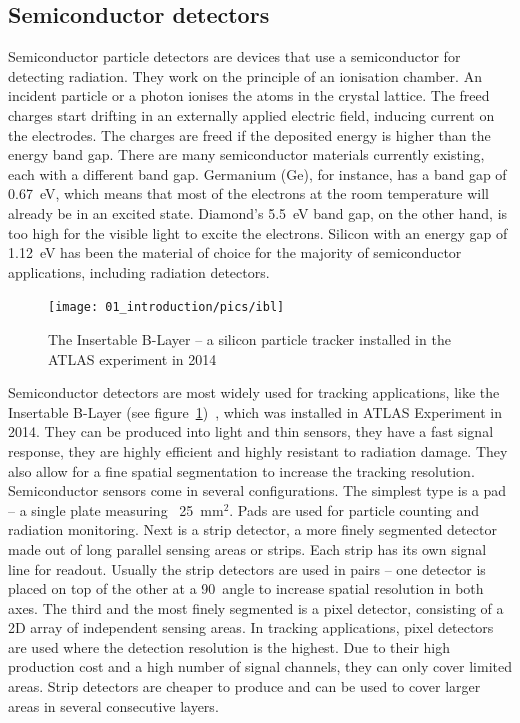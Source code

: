 

\subsection{Semiconductor detectors}
Semiconductor particle detectors are devices that use a semiconductor for detecting radiation. They work on the principle of an ionisation chamber. An incident particle or a photon ionises the atoms in the crystal lattice. The freed charges start drifting in an externally applied electric field, inducing current on the electrodes. The charges are freed if the deposited energy is higher than the energy band gap. There are many semiconductor materials currently existing, each with a different band gap. Germanium (Ge), for instance, has a band gap of 0.67~eV, which means that most of the electrons at the room temperature will already be in an excited state. Diamond's 5.5~eV band gap, on the other hand, is too high for the visible light to excite the electrons. Silicon with an energy gap of 1.12~eV has been the material of choice for the majority of semiconductor applications, including radiation detectors. 
\begin{figure}[!t]
\centering
\texttt{[image: 01\_introduction/pics/ibl]}
\caption{The Insertable B-Layer -- a silicon particle tracker installed in the ATLAS experiment in 2014 \cite{MarcelloniDeOliveira:1702006}}
\label{fig:ibl}
\end{figure}
Semiconductor detectors are most widely used for tracking applications, like the Insertable B-Layer (see figure~\ref{fig:ibl})~\cite{Pernegger:1985432}, which was installed in ATLAS Experiment in 2014. They can be produced into light and thin sensors, they have a fast signal response, they are highly efficient and highly resistant to radiation damage. They also allow for a fine spatial segmentation to increase the tracking resolution. Semiconductor sensors come in several configurations. The simplest type is a pad -- a single plate measuring ~25~mm$^2$. Pads are used for particle counting and radiation monitoring. Next is a strip detector, a more finely segmented detector made out of long parallel sensing areas or strips. Each strip has its own signal line for readout. Usually the strip detectors are used in pairs -- one detector is placed on top of the other at a 90\textdegree~angle to increase spatial resolution in both axes. The third and the most finely segmented is a pixel detector, consisting of a 2D array of independent sensing areas. In tracking applications, pixel detectors are used where the detection resolution is the highest. Due to their high production cost and a high number of signal channels, they can only cover limited areas. Strip detectors are cheaper to produce and can be used to cover larger areas in several consecutive layers.

